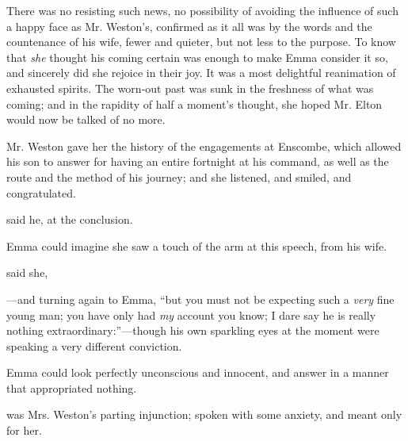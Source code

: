 
There was no resisting such news, no possibility of avoiding the influence of such a happy face as Mr. Weston's, confirmed as it all was by the words and the countenance of his wife, fewer and quieter, but not less to the purpose. To know that {\em she} thought his coming certain was enough to make Emma consider it so, and sincerely did she rejoice in their joy. It was a most delightful reanimation of exhausted spirits. The worn-out past was sunk in the freshness of what was coming; and in the rapidity of half a moment's thought, she hoped Mr. Elton would now be talked of no more.

Mr. Weston gave her the history of the engagements at Enscombe, which allowed his son to answer for having an entire fortnight at his command, as well as the route and the method of his journey; and she listened, and smiled, and congratulated.

 said he, at the conclusion.

Emma could imagine she saw a touch of the arm at this speech, from his wife.

 said she, 

---and turning again to Emma, “but you must not be expecting such a {\em very} fine young man; you have only had {\em my} account you know; I dare say he is really nothing extraordinary:”---though his own sparkling eyes at the moment were speaking a very different conviction.

Emma could look perfectly unconscious and innocent, and answer in a manner that appropriated nothing.

 was Mrs. Weston's parting injunction; spoken with some anxiety, and meant only for her.

